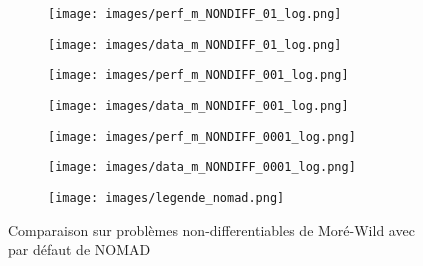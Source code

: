		\begin{figure}[!htb] %
			\centering
			\begin{subfigure}{0.43\textwidth}
				\texttt{[image: images/perf\_m\_NONDIFF\_01\_log.png]}
			\end{subfigure}%
			\begin{subfigure}{0.43\textwidth}
				\texttt{[image: images/data\_m\_NONDIFF\_01\_log.png]}
			\end{subfigure}
			\smallskip
			\begin{subfigure}{0.43\textwidth}
				\texttt{[image: images/perf\_m\_NONDIFF\_001\_log.png]}
			\end{subfigure}%
			\begin{subfigure}{0.43\textwidth}
				\texttt{[image: images/data\_m\_NONDIFF\_001\_log.png]}
			\end{subfigure}
			\smallskip
			\begin{subfigure}{0.43\textwidth}
				\texttt{[image: images/perf\_m\_NONDIFF\_0001\_log.png]}
			\end{subfigure}%
			\begin{subfigure}{0.43\textwidth}
				\texttt{[image: images/data\_m\_NONDIFF\_0001\_log.png]}
			\end{subfigure}
			\smallskip
			\begin{subfigure}{0.95\textwidth}
				\texttt{[image: images/legende\_nomad.png]}
			\end{subfigure}
			\caption{Comparaison sur problèmes non-differentiables de Moré-Wild avec \MADS par défaut de NOMAD} \label{fig:1}
		\end{figure}
		\clearpage
